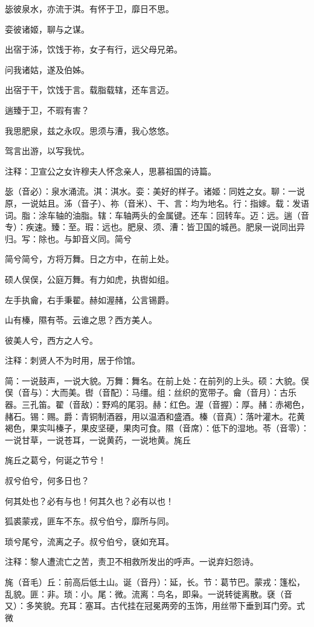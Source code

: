 \documentclass[12pt,UTF8]{ctexbook}
\begin{document}
毖彼泉水，亦流于淇。有怀于卫，靡日不思。

娈彼诸姬，聊与之谋。

出宿于泲，饮饯于祢，女子有行，远父母兄弟。

问我诸姑，遂及伯姊。

出宿于干，饮饯于言。载脂载辖，还车言迈。

遄臻于卫，不瑕有害？

我思肥泉，兹之永叹。思须与漕，我心悠悠。

驾言出游，以写我忧。

注释：卫宣公之女许穆夫人怀念亲人，思慕祖国的诗篇。

毖（音必）：泉水涌流。淇：淇水。娈：美好的样子。诸姬：同姓之女。聊：一说原，一说姑且。泲（音子）、祢（音米）、干、言：均为地名。行：指嫁。载：发语词。脂：涂车轴的油脂。辖：车轴两头的金属键。还车：回转车。迈：远。遄（音专）：疾速。臻：至。瑕：远也。肥泉、须、漕：皆卫国的城邑。肥泉一说同出异归。写：除也。与卸音义同。简兮

简兮简兮，方将万舞。日之方中，在前上处。

硕人俣俣，公庭万舞。有力如虎，执辔如组。

左手执龠，右手秉翟。赫如渥赭，公言锡爵。

山有榛，隰有苓。云谁之思？西方美人。

彼美人兮，西方之人兮。

注释：刺贤人不为时用，居于伶馆。

简：一说鼓声，一说大貌。万舞：舞名。在前上处：在前列的上头。硕：大貌。俣俣（音与）：大而美。辔（音配）：马缰。组：丝织的宽带子。龠（音月）：古乐器。三孔笛。翟（音敌）：野鸡的尾羽。赫：红色。渥（音握）：厚。赭：赤褐色，赭石。锡：赐。爵：青铜制酒器，用以温酒和盛酒。榛（音真）：落叶灌木。花黄褐色，果实叫榛子，果皮坚硬，果肉可食。隰（音席）：低下的湿地。苓（音零）：一说甘草，一说苍耳，一说黄药，一说地黄。旄丘

旄丘之葛兮，何诞之节兮！

叔兮伯兮，何多日也？

何其处也？必有与也！何其久也？必有以也！

狐裘蒙戎，匪车不东。叔兮伯兮，靡所与同。

琐兮尾兮，流离之子。叔兮伯兮，褎如充耳。

注释：黎人遭流亡之苦，责卫不相救所发出的呼声。一说弃妇怨诗。

旄（音毛）丘：前高后低土山。诞（音丹）：延，长。节：葛节巴。蒙戎：篷松，乱貌。匪：非。琐：小。尾：微。流离：鸟名，即枭。一说转徙离散。褎（音又）：多笑貌。充耳：塞耳。古代挂在冠冕两旁的玉饰，用丝带下垂到耳门旁。式微
\end{document}
